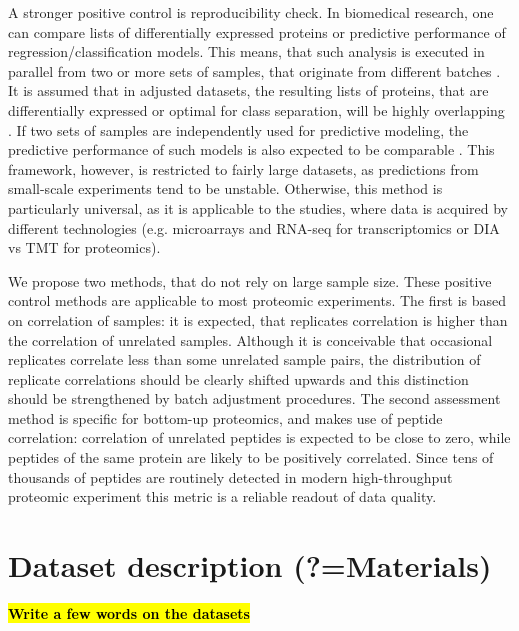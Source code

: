 \documentclass[num-refs]{wiley-article}
\begin{document}
A stronger positive control is reproducibility check. In biomedical research, one can compare lists of differentially expressed proteins or predictive performance of regression/classification models. This means, that such analysis is executed in parallel from two or more sets of samples, that originate from different batches \cite{Lazar:2013aa}. It is assumed that in adjusted datasets, the resulting lists of proteins, that are differentially expressed or optimal for class separation, will be highly overlapping \cite{Shabalin:2008aa}. If two sets of samples are independently used for predictive modeling, the predictive performance of such models is also expected to be comparable \cite{Luo2010}. This framework, however, is restricted to fairly large datasets, as predictions from small-scale experiments tend to be unstable. Otherwise, this method is particularly universal, as it is applicable to the studies, where data is acquired by different technologies (e.g. microarrays and RNA-seq for transcriptomics or DIA vs TMT for proteomics).
 
We propose two methods, that do not rely on large sample size. These positive control methods are applicable to most proteomic experiments. The first is based on correlation of samples: it is expected, that replicates correlation is higher than the correlation of unrelated samples. Although it is conceivable that occasional replicates correlate less than some unrelated sample pairs, the distribution of replicate correlations should be clearly shifted upwards and this distinction should be strengthened by batch adjustment procedures. The second assessment method is specific for bottom-up proteomics, and makes use of peptide correlation: correlation of unrelated peptides is expected to be close to zero, while peptides of the same protein are likely to be positively correlated. Since tens of thousands of peptides are routinely detected in modern high-throughput proteomic experiment this metric is a reliable readout of data quality.

\section{Dataset description (?=Materials)}

\textcolor{red}{\textbf{\hl{Write a few words on the datasets}}}
\end{document}
